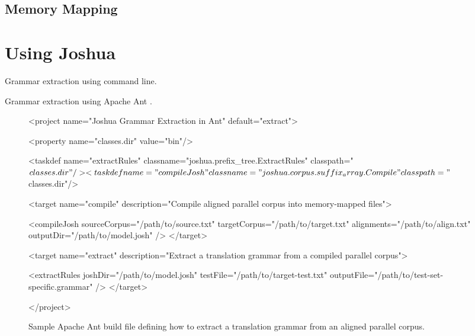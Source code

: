 \documentclass{pbml}
\begin{document}
\subsection{Memory Mapping}






\section{Using Joshua}

Grammar extraction using command line.

Grammar extraction using Apache Ant \cite{ant1.7.1}.

\begin{figure}
\begin{verbatimtab}[4]
<project name="Joshua Grammar Extraction in Ant" default="extract">
    
	<property name="classes.dir" value="bin"/>
 	
	<taskdef name="extractRules" 
		classname="joshua.prefix_tree.ExtractRules" 
		classpath="${classes.dir}"/>
	
	<taskdef name="compileJosh" 
		classname="joshua.corpus.suffix_array.Compile" 
		classpath="${classes.dir}"/>
	
	<target name="compile" 
		description="Compile aligned parallel corpus
			 into memory-mapped files">
		
		<compileJosh
			sourceCorpus="/path/to/source.txt"
			targetCorpus="/path/to/target.txt"
			alignments="/path/to/align.txt"
			outputDir="/path/to/model.josh"
		/>
	</target>
	
	<target name="extract" 
		description="Extract a translation grammar 
			from a compiled parallel corpus">
		
		<extractRules 
			joshDir="/path/to/model.josh" 
			testFile="/path/to/target-test.txt" 
			outputFile="/path/to/test-set-specific.grammar"
		/>    
	</target>
	
</project>
\end{verbatimtab}
\caption{Sample Apache Ant build file defining how to extract a translation grammar from an aligned parallel corpus.}
\end{figure}
\end{document}
